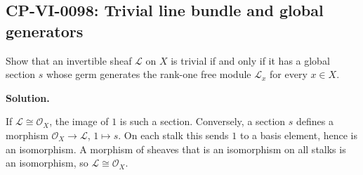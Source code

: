 
\subsection*{CP-VI-0098: Trivial line bundle and global generators}

Show that an invertible sheaf $\mathcal L$ on $X$ is trivial if and only if it has a global section $s$ whose germ generates the rank-one free module $\mathcal L_x$ for every $x\in X$.

\medskip
\noindent\textbf{Solution.}

If $\mathcal L\cong\mathcal O_X$, the image of $1$ is such a section. Conversely, a section $s$ defines a morphism $\mathcal O_X\to\mathcal L$, $1\mapsto s$. On each stalk this sends $1$ to a basis element, hence is an isomorphism. A morphism of sheaves that is an isomorphism on all stalks is an isomorphism, so $\mathcal L\cong\mathcal O_X$.
